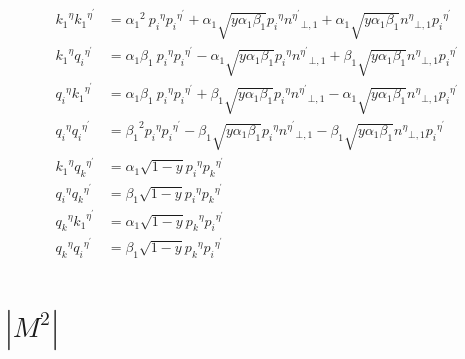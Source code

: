 \begin{equation}
\begin{split}
{k_1}^{{\eta}}{k_1}^{{\eta}^{\prime}}&={\alpha_1}^2\: {p_i}^{{\eta}}{p_i}^{{\eta}^{\prime}}+\alpha_1 \sqrt{y\alpha_1\beta_1}{p_i}^{{\eta}}{n^{{\eta}^{\prime}}}_{\bot,1}+\alpha_1 \sqrt{y\alpha_1\beta_1}{n^{\eta}}_{\bot,1}{p_i}^{{\eta}^{\prime}}\\
{k_1}^{{\eta}}{q_i}^{{\eta}^{\prime}}&={\alpha_1}\beta_1 \:{p_i}^{{\eta}}{p_i}^{{\eta}^{\prime}}-\alpha_1 \sqrt{y\alpha_1\beta_1}{p_i}^{{\eta}}{n^{{\eta}^{\prime}}}_{\bot,1}+\beta_1 \sqrt{y\alpha_1\beta_1}{n^{\eta}}_{\bot,1}{p_i}^{{\eta}^{\prime}}\\
{q_i}^{{\eta}}{k_1}^{{\eta}^{\prime}}&={\alpha_1}\beta_1 \:{p_i}^{{\eta}}{p_i}^{{\eta}^{\prime}}+\beta_1 \sqrt{y\alpha_1\beta_1}{p_i}^{{\eta}}{n^{{\eta}^{\prime}}}_{\bot,1}-\alpha_1 \sqrt{y\alpha_1\beta_1}{n^{\eta}}_{\bot,1}{p_i}^{{\eta}^{\prime}}\\
{q_i}^{{\eta}}{q_i}^{{\eta}^{\prime}}&={\beta_1}^2 {p_i}^{{\eta}}{p_i}^{{\eta}^{\prime}}-\beta_1 \sqrt{y\alpha_1\beta_1}{p_i}^{{\eta}}{n^{{\eta}^{\prime}}}_{\bot,1}-\beta_1 \sqrt{y\alpha_1\beta_1}{n^{\eta}}_{\bot,1}{p_i}^{{\eta}^{\prime}}\\
{k_1}^{{\eta}}{q_k}^{{\eta}^{\prime}}&=\alpha_1 \sqrt{1-y}{p_i}^{{\eta}}{{p_k}^{{\eta}^{\prime}}}\\
{q_i}^{{\eta}}{q_k}^{{\eta}^{\prime}}&=\beta_1 \sqrt{1-y}{p_i}^{{\eta}}{{p_k}^{{\eta}^{\prime}}}\\
{q_k}^{\eta}{k_1}^{{{\eta}}^{\prime}}&=\alpha_1 \sqrt{1-y}{p_k}^{{\eta}}{p_i}^{{\eta}^{\prime}}\\
{q_k}^{\eta}{q_i}^{{{\eta}}^{\prime}}&=\beta_1 \sqrt{1-y}{p_k}^{{\eta}}{p_i}^{{\eta}^{\prime}}\\
\end{split}
\end{equation}

\pagebreak

\section{$|M^{2}|$}
%





























